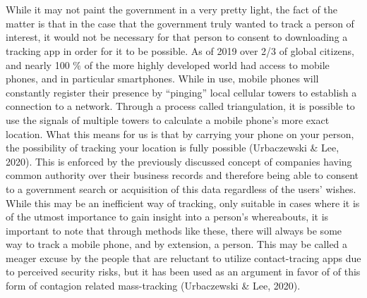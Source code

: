 \documentclass[11pt]{article}
\begin{document}
\\ \\
While it may not paint the government in a very pretty light, the fact of the matter is that in the case that the government truly wanted to track a person of interest, it would not be necessary for that person to consent to downloading a tracking app in order for it to be possible.
As of 2019 over 2/3 of global citizens, and nearly 100 $\%$ of the more highly developed world had access to mobile phones, and in particular smartphones. While in use, mobile phones will constantly register their presence by “pinging” local cellular towers to establish a connection to a network. Through a process called triangulation, it is possible to use the signals of multiple towers to calculate a mobile phone’s more exact location. What this means for us is that by carrying your phone on your person, the possibility of tracking your location is fully possible (Urbaczewski \& Lee, 2020). This is enforced by the previously discussed concept of companies having common authority over their business records and therefore being able to consent to a government search or acquisition of this data regardless of the users’ wishes. 
While this may be an inefficient way of tracking, only suitable in cases where it is of the utmost importance to gain insight into a person’s whereabouts, it is important to note that through methods like these, there will always be some way to track a mobile phone, and by extension, a person.
This may be called a meager excuse by the people that are reluctant to utilize contact-tracing apps due to perceived security risks, but it has been used as an argument in favor of of this form of contagion related mass-tracking (Urbaczewski \& Lee, 2020).
\\
\end{document}
